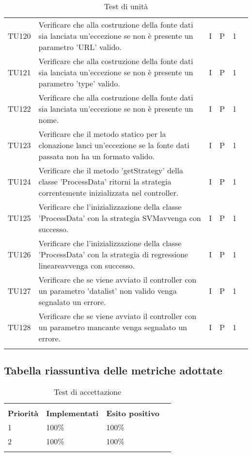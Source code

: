 \begin{longtable} {
		>{}p{12mm}
		>{}p{79.5mm}
		>{}p{9mm}
		>{}p{8mm}
		>{}p{14mm}
		>{}p{0mm}}
	TU120		& Verificare che alla costruzione della fonte dati sia lanciata un'eccezione se non è presente un parametro 'URL' valido.& I & P & 1 &\TBstrut \\ [2mm]
	TU121		& Verificare che alla costruzione della fonte dati sia lanciata un'eccezione se non è presente un parametro 'type' valido.& I & P & 1 &\TBstrut \\ [2mm]
	TU122		& Verificare che alla costruzione della fonte dati sia lanciata un'eccezione se non è presente un nome.& I & P & 1 &\TBstrut \\ [2mm]
	TU123		& Verificare che il metodo statico per la clonazione lanci un'eccezione se la fonte dati passata non ha un formato valido. & I & P & 1 &\TBstrut \\ [2mm]
	TU124		& Verificare che il metodo 'getStrategy' della classe 'ProcessData' ritorni la strategia correntemente inizializzata nel controller. & I & P & 1 &\TBstrut \\ [2mm]
	TU125		& Verificare che l'inizializzazione della classe 'ProcessData' con la strategia SVM\glosp avvenga con successo. & I & P & 1 &\TBstrut \\ [2mm]
	TU126		& Verificare che l'inizializzazione della classe 'ProcessData' con la strategia di regressione lineare\glosp avvenga con successo. & I & P & 1 &\TBstrut \\ [2mm]
	TU127		& Verificare che se viene avviato il controller con un parametro 'datalist' non valido venga segnalato un errore. & I & P & 1 &\TBstrut \\ [2mm]
	TU128		& Verificare che se viene avviato il controller con un parametro mancante venga segnalato un errore. & I & P & 1 &\TBstrut \\ [2mm]

	\rowcolor{white}
	\caption{Test di unità}
\end{longtable}


\subsection{Tabella riassuntiva delle metriche adottate}
\begin{longtable} {
		>{}p{42.85mm}
		>{}p{42.85mm}
		>{}p{42.85mm}
		>{}p{0mm}}
	\rowcolor{gray!50}
	\multicolumn{4}{c}{\textbf{Tabella riassuntiva dei test di accettazione}}\\
	\rowcolor{gray!50}
	\textbf{Priorità} & \textbf{Implementati} & \textbf{Esito positivo} &\TBstrut \\ [2mm]
	 1                & 100\%                 & 100\%				    &\TBstrut \\ [2mm]
	 2                & 100\%                 & 100\%				    &\TBstrut \\ [2mm]

	\rowcolor{white}
	\caption{Test di accettazione}
\end{longtable}


